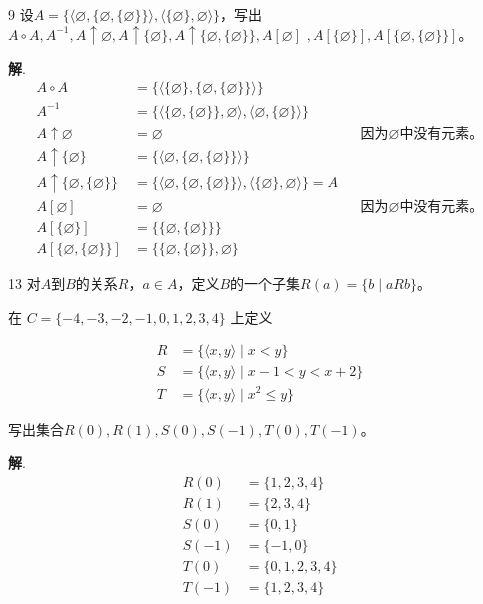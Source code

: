 \documentclass[12pt]{article}
\newenvironment{firstlayer}%
{\begin{list}{}{\renewcommand{\makelabel}[1]{\textbf{##1}.\hfil}
}}
{\end{list}}
\newenvironment{secondlayer}%
{\begin{list}{}{\renewcommand{\makelabel}[1]{(##1)\hfil}
}}
{\end{list}}
\providecommand{\sol}{\textbf{解}.~}
\begin{document}
\begin{CJK}{UTF8}{gbsn}
\begin{firstlayer}
\begin{secondlayer}
\end{secondlayer}
\item[9] 设$A=\{\langle \varnothing,\{ \varnothing,\{ \varnothing \} \} \rangle ,\langle \{ \varnothing \},\varnothing \rangle  \}$，写出$A\circ A,A^{-1},A\uparrow \varnothing,A\uparrow\{\varnothing\},A\uparrow\{\varnothing,\{ \varnothing \}\},A[\varnothing]$ $,A[\{ \varnothing \}],A[\{\varnothing, \{ \varnothing\}\}]$。

\sol 
\begin{align*}
  A\circ A&=\{ \langle \{ \varnothing \}, \{ \varnothing,\{ \varnothing \} \}\rangle \}\\
A^{-1}&=\{\langle \{ \varnothing,\{ \varnothing \} \},\varnothing \rangle ,\langle \varnothing,\{ \varnothing \} \rangle  \}\\
A\uparrow \varnothing&=\varnothing &&\text{因为$\varnothing$中没有元素。}\\
A\uparrow\{\varnothing\}&=\{\langle \varnothing,\{ \varnothing,\{ \varnothing \} \} \rangle\}\\
A\uparrow\{\varnothing,\{ \varnothing \}\}&=\{\langle \varnothing,\{ \varnothing,\{ \varnothing \} \} \rangle ,\langle \{ \varnothing \},\varnothing \rangle  \}=A\\
A[\varnothing]&=\varnothing &&\text{因为$\varnothing$中没有元素。}\\
A[\{ \varnothing \}]&=\{\{ \varnothing,\{ \varnothing \} \}\}\\
A[\{\varnothing, \{ \varnothing\}\}]&=\{\{ \varnothing,\{ \varnothing \} \},\varnothing \}
\end{align*}

\item[13] 对$A$到$B$的关系$R$，$a\in A$，定义$B$的一个子集$R(a)=\{b\mid aRb\}$。

在 $C=\{-4,-3,-2,-1,0,1,2,3,4\}$ 上定义

\begin{align*}
R&=\{ \langle x,y \rangle \mid x<y\}\\S&=\{ \langle x,y \rangle\mid x-1<y<x+2 \}\\T&=\{ \langle x,y \rangle \mid x^2\leq y \}
\end{align*}

写出集合$R(0),R(1),S(0),S(-1),T(0),T(-1)$。

\sol \begin{align*}
       R(0)&=\{1,2,3,4\}\\R(1)&=\{2,3,4\}\\S(0)&=\{0,1 \}\\S(-1)&=\{ -1,0 \}\\T(0)&=\{0,1,2,3,4\}\\T(-1)&=\{1,2,3,4\}
     \end{align*}


\end{firstlayer}

\end{CJK}
\end{document}
